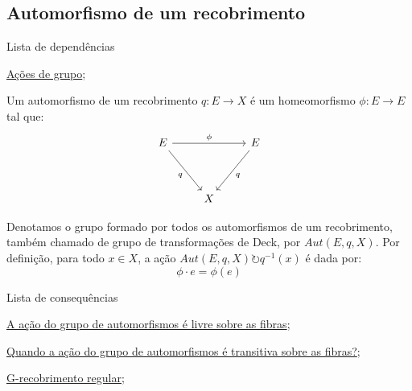 \subsection{Automorfismo de um recobrimento}
\label{automorfismo-de-recobrimento-def}
\begin{titlemize}{Lista de dependências}
	\item \hyperref[ações-de-grupo-def]{Ações de grupo};
\end{titlemize}
\begin{defi}
    Um automorfismo de um recobrimento $q:E \longrightarrow X$ é um homeomorfismo $\phi:E \longrightarrow E$ tal que:
    \[\begin{tikzcd}
	E && E \\
	\\
	& X
	\arrow["\phi", from=1-1, to=1-3]
	\arrow["q"', from=1-1, to=3-2]
	\arrow["q", from=1-3, to=3-2]
    \end{tikzcd}\]
\end{defi}

Denotamos o grupo formado por todos os automorfismos de um recobrimento, também chamado de grupo de transformações de Deck, por $Aut(E, q, X)$. Por definição, para todo $x \in X$, a ação $Aut(E, q, X) \circlearrowright q^{-1}(x)$ é dada por: $$\phi \cdot e = \phi(e)$$

\begin{titlemize}{Lista de consequências}
	\item \hyperref[acao-de-automorfismos-e-livre-prop]{A ação do grupo de automorfismos é livre sobre as fibras};\\
    \item \hyperref[acao-de-automorfismo-transitiva-prop]{Quando a ação do grupo de automorfismos é transitiva sobre as fibras?};\\
    \item \hyperref[g-recobrimento-regular-def]{G-recobrimento regular};
\end{titlemize}
